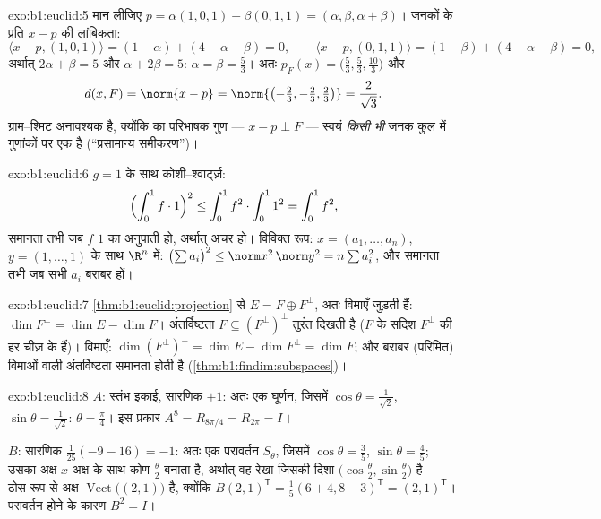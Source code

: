 \begin{solution}{exo:b1:euclid:5}
मान लीजिए $p = \alpha(1,0,1) + \beta(0,1,1) = (\alpha, \beta, \alpha +
\beta)$। जनकों के प्रति $x - p$ की लांबिकता:
\[
\langle x - p, (1,0,1)\rangle = (1 - \alpha) + (4 - \alpha - \beta)
= 0,
\qquad
\langle x - p, (0,1,1)\rangle = (1 - \beta) + (4 - \alpha - \beta)
= 0,
\]
अर्थात् $2\alpha + \beta = 5$ और $\alpha + 2\beta = 5$: $\alpha = \beta =
\frac53$। अतः $p_F(x) = \bigl(\frac53, \frac53, \frac{10}{3}\bigr)$ और
\[
d(x, F) = \norm{x - p} =
\norm{\bigl(-\tfrac23, -\tfrac23, \tfrac23\bigr)} =
\frac{2}{\sqrt 3} .
\]
ग्राम--श्मिट अनावश्यक है, क्योंकि  का परिभाषक गुण --- $x - p \perp
F$ --- स्वयं \emph{किसी भी} जनक कुल में गुणांकों पर एक  है
(``प्रसामान्य समीकरण'')।
\end{solution}

\begin{solution}{exo:b1:euclid:6}
$g = 1$ के साथ कोशी--श्वार्ट्ज़:
\[
\Bigl(\int_0^1 f \cdot 1\Bigr)^2 \leq \int_0^1 f^2 \cdot \int_0^1
1^2 = \int_0^1 f^2 ,
\]
समानता तभी जब $f$ $1$ का अनुपाती हो, अर्थात् अचर हो। विविक्त रूप: $x = (a_1,
\dots, a_n)$, $y = (1, \dots, 1)$ के साथ $\R^n$ में: $\bigl(\sum a_i\bigr)^2
\leq \norm x^2\, \norm y^2 = n \sum a_i^2$, और समानता तभी जब सभी $a_i$ बराबर
हों।
\end{solution}

\begin{solution}{exo:b1:euclid:7}
\cref{thm:b1:euclid:projection} से $E = F \oplus F^\perp$, अतः विमाएँ जुड़ती
हैं: $\dim F^\perp = \dim E - \dim F$। अंतर्विष्टता $F \subseteq
(F^\perp)^\perp$ तुरंत दिखती है ($F$ के सदिश $F^\perp$ की हर चीज़ के 
हैं)। विमाएँ: $\dim(F^\perp)^\perp = \dim E - \dim F^\perp = \dim F$; और
बराबर (परिमित) विमाओं वाली अंतर्विष्टता समानता होती है
(\cref{thm:b1:findim:subspaces})।
\end{solution}

\begin{solution}{exo:b1:euclid:8}
$A$: स्तंभ इकाई, सारणिक $+1$: अतः एक घूर्णन, जिसमें $\cos\theta =
\frac{1}{\sqrt2}$, $\sin\theta = \frac{1}{\sqrt2}$: $\theta = \frac\pi4$। इस
प्रकार $A^8 = R_{8\pi/4} = R_{2\pi} = I$।

$B$: सारणिक $\frac{1}{25}(-9 - 16) = -1$: अतः एक परावर्तन $S_\theta$, जिसमें
$\cos\theta = \frac35$, $\sin\theta = \frac45$; उसका अक्ष $x$-अक्ष के साथ
कोण $\frac\theta2$ बनाता है, अर्थात् वह रेखा जिसकी दिशा
$\bigl(\cos\frac\theta2, \sin\frac\theta2\bigr)$ है --- ठोस रूप से अक्ष
$\operatorname{Vect}\bigl((2, 1)\bigr)$ है, क्योंकि $B(2,1)^{\mathsf T} =
\frac15(6+4, 8-3)^{\mathsf T} = (2,1)^{\mathsf T}$। परावर्तन होने के कारण
$B^2 = I$।
\end{solution}

